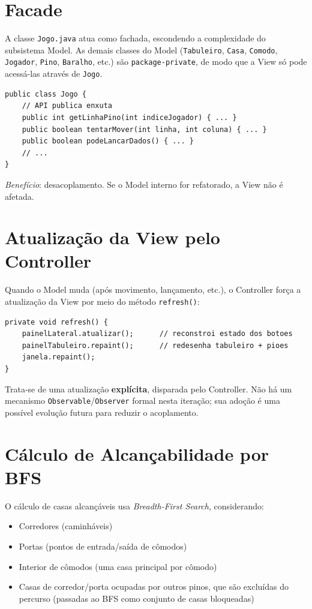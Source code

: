 \documentclass[12pt,a4paper]{report}
\begin{document}
\section{Facade}

A classe \texttt{Jogo.java} atua como fachada, escondendo a complexidade do subsistema Model. As demais classes do Model (\texttt{Tabuleiro}, \texttt{Casa}, \texttt{Comodo}, \texttt{Jogador}, \texttt{Pino}, \texttt{Baralho}, etc.) são \texttt{package-private}, de modo que a View só pode acessá-las através de \texttt{Jogo}.

\begin{lstlisting}
public class Jogo {
    // API publica enxuta
    public int getLinhaPino(int indiceJogador) { ... }
    public boolean tentarMover(int linha, int coluna) { ... }
    public boolean podeLancarDados() { ... }
    // ...
}
\end{lstlisting}

\textit{Benefício}: desacoplamento. Se o Model interno for refatorado, a View não é afetada.

\section{Atualização da View pelo Controller}

Quando o Model muda (após movimento, lançamento, etc.), o Controller força a atualização da View por meio do método \texttt{refresh()}:

\begin{lstlisting}
private void refresh() {
    painelLateral.atualizar();      // reconstroi estado dos botoes
    painelTabuleiro.repaint();      // redesenha tabuleiro + pioes
    janela.repaint();
}
\end{lstlisting}

Trata-se de uma atualização \textbf{explícita}, disparada pelo Controller. Não há um mecanismo \texttt{Observable}/\texttt{Observer} formal nesta iteração; sua adoção é uma possível evolução futura para reduzir o acoplamento.

\section{Cálculo de Alcançabilidade por BFS}

O cálculo de casas alcançáveis usa \textit{Breadth-First Search}, considerando:
\begin{itemize}
    \item Corredores (caminháveis)
    \item Portas (pontos de entrada/saída de cômodos)
    \item Interior de cômodos (uma casa principal por cômodo)
    \item Casas de corredor/porta ocupadas por outros pinos, que são excluídas do percurso (passadas ao BFS como conjunto de casas bloqueadas)
\end{itemize}
\end{document}
